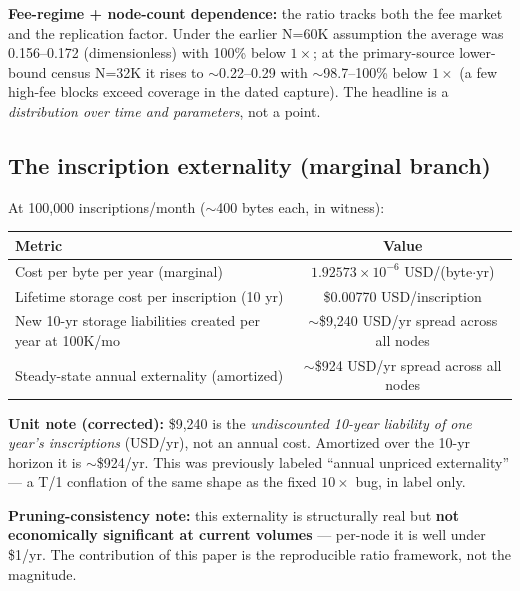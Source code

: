 \documentclass[11pt]{article}
\begin{document}
\textbf{Fee-regime + node-count dependence:} the ratio tracks both the fee market and the replication factor. Under the earlier N=60K assumption the average was 0.156--0.172 (dimensionless) with 100\% below $1\times$; at the primary-source lower-bound census N=32K it rises to $\sim$0.22--0.29 with $\sim$98.7--100\% below $1\times$ (a few high-fee blocks exceed coverage in the dated capture). The headline is a \emph{distribution over time and parameters}, not a point.

\subsection{The inscription externality (marginal branch)}\label{sec:5.2}
At 100{,}000 inscriptions/month ($\sim$400 bytes each, in witness):
\begin{center}
\begin{tabular}{lc}
\toprule
Metric & Value \\
\midrule
Cost per byte per year (marginal) & $1.92573\times10^{-6}$ USD/(byte$\cdot$yr) \\
Lifetime storage cost per inscription (10 yr) & \$0.00770 USD/inscription \\
New 10-yr storage liabilities created per year at 100K/mo & $\sim$\$9{,}240 USD/yr spread across all nodes \\
Steady-state annual externality (amortized) & $\sim$\$924 USD/yr spread across all nodes \\
\bottomrule
\end{tabular}
\end{center}
\textbf{Unit note (corrected):} \$9{,}240 is the \emph{undiscounted 10-year liability of one year's inscriptions} (USD/yr), not an annual cost. Amortized over the 10-yr horizon it is $\sim$\$924/yr. This was previously labeled ``annual unpriced externality'' --- a T/1 conflation of the same shape as the fixed $10\times$ bug, in label only.

\textbf{Pruning-consistency note:} this externality is structurally real but \textbf{not economically significant at current volumes} --- per-node it is well under \$1/yr. The contribution of this paper is the reproducible ratio framework, not the magnitude.
\end{document}

